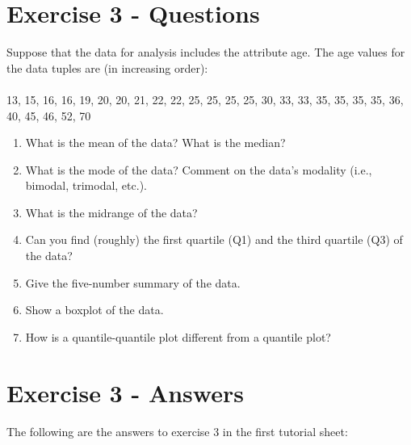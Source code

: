 \documentclass{scrreprt}
\begin{document}
\section{Exercise 3 - Questions}
Suppose that the data for analysis includes the attribute age. The age values for the data tuples are (in increasing order):
\\
\\
13, 15, 16, 16, 19, 20, 20, 21, 22, 22, 25, 25, 25, 25, 30, 33, 33, 35, 35, 35, 35, 36, 40, 45, 46, 52, 70
\begin{enumerate}
\item What is the mean of the data? What is the median?
\item What is the mode of the data? Comment on the data’s modality (i.e., bimodal, trimodal, etc.). 
\item What is the midrange of the data?
\item Can you find (roughly) the first quartile (Q1) and the third quartile (Q3) of the data?
\item Give the five-number summary of the data.
\item Show a boxplot of the data.
\item How is a quantile-quantile plot different from a quantile plot?
\end{enumerate}




\section{Exercise 3 - Answers}	
The following are the answers to exercise 3 in the first tutorial sheet:
\end{document}
